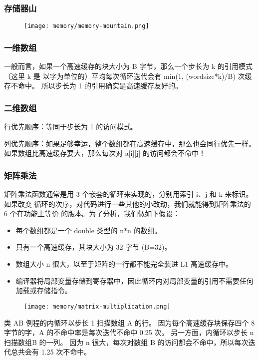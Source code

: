 \subsubsection{存储器山}
\begin{figure}[H]
    \centering
    \texttt{[image: memory/memory-mountain.png]}
\end{figure}

\subsubsection{一维数组}
一般而言，如果一个高速缓存的块大小为 B 字节，那么一个步长为 k 的引用模式（这里 k 是
以字为单位的）平均每次循环迭代会有 min(1, (wordsize*k)/B) 次缓存不命中。
所以步长为 1 的引用确实是高速缓存友好的。
\subsubsection{二维数组}
行优先顺序：等同于步长为 1 的访问模式。

列优先顺序：如果足够幸运，整个数组都在高速缓存中，那么也会同行优先一样。如果数组比高速缓存要大，那么每次对 a[i][j] 的访问都会不命中！

\subsubsection{矩阵乘法}
矩阵乘法函数通常是用 3 个嵌套的循环来实现的，分别用索引 i、j 和 k 来标识。如果改变
循环的次序，对代码进行一些其他的小改动，我们就能得到矩阵乘法的 6 个在功能上等价
的版本。为了分析，我们做如下假设：
\begin{itemize}
    \item 每个数组都是一个 double 类型的 n*n 的数组。
    \item 只有一个高速缓存，其块大小为 32 字节 (B=32)。
    \item 数组大小 n 很大，以至于矩阵的一行都不能完全装进 L1 高速缓存中。
    \item 编译器将局部变量存储到寄存器中，因此循环内对局部变量的引用不需要任何加载或存储指令。
\end{itemize}
\begin{figure}[H]
    \centering
    \texttt{[image: memory/matrix-multiplication.png]}
\end{figure}

类 AB 例程的内循环以步长 1 扫描数组 A 的行。
因为每个高速缓存块保存四个 8 字节的字，A 的不命中率是每次迭代不命中 0.25 次。
另一方面，内循环以步长 n 扫描数组B 的一列。
因为 n 很大，每次对数组 B 的访问都会不命中，所以每次迭代总共会有 1.25 次不命中。

